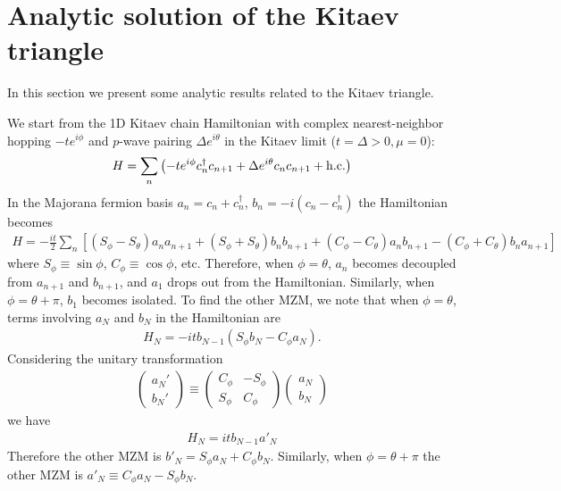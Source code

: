 \documentclass[aps,physrev,amsmath,amssymb]{revtex4-2}
\begin{document}
\section{Analytic solution of the Kitaev triangle}
In this section we present some analytic results related to the Kitaev triangle. 

We start from the 1D Kitaev chain Hamiltonian with complex nearest-neighbor hopping $-te^{i\phi}$ and $p$-wave pairing $\Delta e^{i\theta}$ in the Kitaev limit ($t=\Delta > 0, \mu = 0$):
\begin{eqnarray}
	H = \sum_{n}\left(- te^{i\phi}c_n^\dag c_{n+1} + \Delta e^{i\theta}c_nc_{n+1} + {\rm h.c.}\right)
\end{eqnarray}
In the Majorana fermion basis $a_n = c_n + c_n^\dag$, $b_n = -i(c_n - c_n^\dag)$ the Hamiltonian becomes
\begin{eqnarray}
H = -\frac{it}{2} \sum_n \left[(S_\phi - S_\theta) a_n a_{n+1} + (S_\phi + S_\theta)b_n b_{n+1} + (C_\phi - C_\theta) a_n b_{n+1} - (C_\phi + C_\theta)b_na_{n+1}\right]
\end{eqnarray}
where $S_\phi\equiv \sin\phi$, $C_\phi\equiv \cos\phi$, etc. Therefore, when $\phi = \theta$, $a_n$ becomes decoupled from $a_{n+1}$ and $b_{n+1}$, and $a_1$ drops out from the Hamiltonian. Similarly, when $\phi = \theta + \pi$, $b_1$ becomes isolated. To find the other MZM, we note that when $\phi = \theta$, terms involving $a_{N}$ and $b_N$ in the Hamiltonian are
\begin{eqnarray}
	H_N = -itb_{N-1}(S_\phi b_{N} - C_\phi a_N).
\end{eqnarray}
Considering the unitary transformation
\begin{eqnarray}
	\begin{pmatrix}
		a_N' \\
		b_N'
	\end{pmatrix} \equiv\begin{pmatrix}
	C_\phi & - S_\phi\\
	S_\phi & C_\phi 
\end{pmatrix}\begin{pmatrix}
a_N\\
b_N
\end{pmatrix}
\end{eqnarray}
we have 
\begin{eqnarray}
	H_N = itb_{N-1} a'_N
\end{eqnarray}
Therefore the other MZM is $b'_N = S_\phi a_N + C_\phi b_N$. Similarly, when $\phi = \theta + \pi$ the other MZM is $a'_{N} \equiv C_\phi a_N - S_\phi b_N$. 
\end{document}
